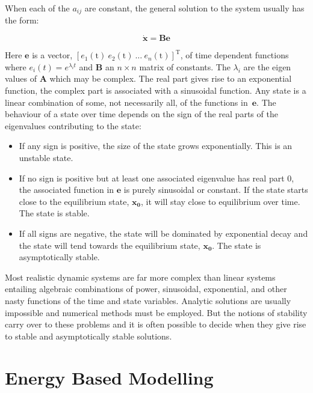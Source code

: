 \documentclass{UoNMCHA}
\numberwithin{equation}{section}
\begin{document}
When each of the $a_{ij}$ are constant, the general solution to the system usually has the form: 

\begin{equation}
\mathbf{\dot{x}=Be}
\end{equation}

Here $\mathbf{e}$ is a vector, $\left[e_1\mathrm{(t)\ } e_2\mathrm{(t)\ } \ldots\mathrm{\ } e_n\mathrm{(t)} \right]^\mathrm{T}$, of time dependent functions where  $e_i\left(t\right)=e^{\lambda_it}$ and $\mathbf{B}$ an $n\times n$ matrix of constants. The $\lambda_i$ are the eigen values of $\mathbf{A}$ which may be complex. The real part gives rise to an exponential function, the complex part is associated with a sinusoidal function.  Any state is a linear combination of some, not necessarily all, of the functions in\ $\mathbf{e}$. The behaviour of a state over time depends on the sign of the real parts of the eigenvalues contributing to the state:

\begin{itemize}
\item	If any sign is positive, the size of the state grows exponentially. This is an unstable state.

\item	If no sign is positive but at least one associated eigenvalue has real part 0, the associated function in $\mathbf{e}$ is purely sinusoidal or constant. If the state starts close to the equilibrium state, $\mathbf{x}_\mathbf{0}$, it will stay close to equilibrium over time. The state is stable.

\item	If all signs are negative, the state will be dominated by exponential decay and the state will tend towards the equilibrium state, $\mathbf{x}_\mathbf{0}$. The state is asymptotically stable.
\end{itemize}

Most realistic dynamic systems are far more complex than linear systems entailing algebraic combinations of power, sinusoidal, exponential, and other nasty functions of the time and state variables. Analytic solutions are usually impossible and numerical methods must be employed. But the notions of stability carry over to these problems and it is often possible to decide when they give rise to stable and asymptotically stable solutions.


\section{Energy Based Modelling}\label{Energy Based Modelling}
\end{document}
